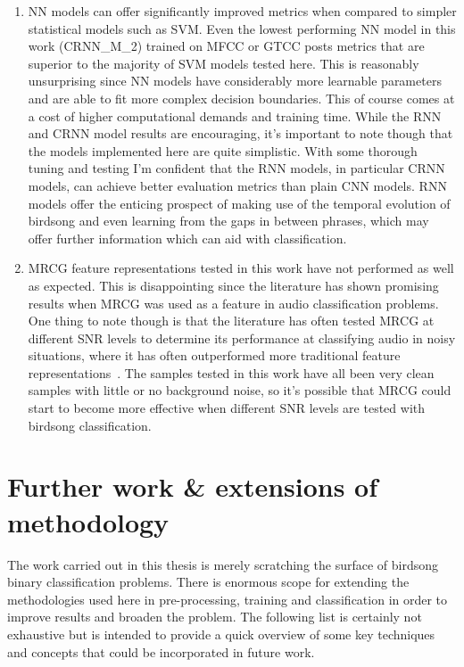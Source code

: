\begin{enumerate}
  \item NN models can offer significantly improved metrics when compared to
    simpler statistical models such as SVM\@. Even the lowest performing NN
    model in this work (CRNN\_M\_2) trained on MFCC or GTCC posts metrics that
    are superior to the majority of SVM models tested here. This is reasonably
    unsurprising since NN models have considerably more learnable parameters and
    are able to fit more complex decision boundaries. This of course comes at a
    cost of higher computational demands and training time. While the RNN and
    CRNN model results are encouraging, it's important to note though that the
    models implemented here are quite simplistic. With some thorough tuning and
    testing I'm confident that the RNN models, in particular CRNN models, can
    achieve better evaluation metrics than plain CNN models. RNN models offer
    the enticing prospect of making use of the temporal evolution of birdsong
    and even learning from the gaps in between phrases, which may offer further
    information which can aid with classification.

  \item MRCG feature representations tested in this work have not performed as
    well as expected. This is disappointing since the literature has shown
    promising results when MRCG was used as a feature in audio classification
    problems. One thing to note though is that the literature has often tested
    MRCG at different SNR levels to determine its performance at classifying
    audio in noisy situations, where it has often outperformed more traditional
    feature representations~\cite{binti2020comparison,chen2014feature}. The
    samples tested in this work have all been very clean samples with little or
    no background noise, so it's possible that MRCG could start to become more
    effective when different SNR levels are tested with birdsong
    classification.

\end{enumerate}

\section{Further work \& extensions of methodology}

The work carried out in this thesis is merely scratching the surface of birdsong
binary classification problems. There is enormous scope for extending the
methodologies used here in pre-processing, training and classification in order
to improve results and broaden the problem. The following list is certainly not
exhaustive but is intended to provide a quick overview of some key techniques
and concepts that could be incorporated in future work.

